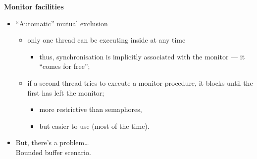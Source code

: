 \documentclass[11pt,a4paper]{article}
\begin{document}
\textbf{Monitor facilities}
\begin{itemize}
    \item ``Automatic'' mutual exclusion
        \begin{itemize}
            \item only one thread can be executing inside at any time
                \begin{itemize}
                    \item thus, synchronisation is implicitly associated with the monitor
                        --- it ``comes for free'';
                \end{itemize}
            \item if a second thread tries to execute a monitor procedure,
                it blocks until the first has left the monitor;
                \begin{itemize}
                    \item more restrictive than semaphores,
                    \item but easier to use (most of the time).
                \end{itemize}
        \end{itemize}
    \item But, there's a problem\dots \\
        Bounded buffer scenario.
\end{itemize}
\end{document}
